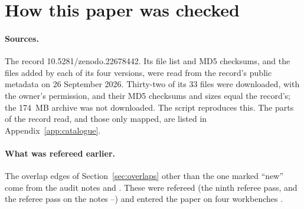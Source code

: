 \section{How this paper was checked}\label{app:verification}

\paragraph{Sources.}
The record 10.5281/zenodo.22678442. Its file list and MD5 checksums, and the files added by each of its four versions, were read from the record's public metadata on 26 September 2026. Thirty-two of its 33 files were downloaded, with the owner's permission, and their MD5 checksums and sizes equal the record's; the 174~MB archive  was not downloaded. The script  reproduces this. The parts of the record read, and those only mapped, are listed in Appendix~\ref{app:catalogue}.

\paragraph{What was refereed earlier.}
The overlap edges of Section~\ref{sec:overlaps} other than the one marked ``new'' come from the audit notes  and . These were refereed (the ninth referee pass, and the referee pass on the notes --) and entered the paper on four workbenches \cite{WorkbenchReader}.


